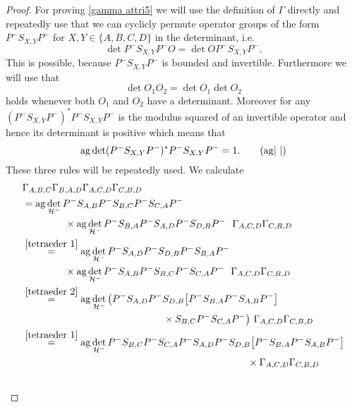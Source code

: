 \documentclass[b5paper,draft,openbib,12pt]{memoir}
\DeclareMathOperator{\ag}{ag}
\begin{document}
\begin{proof}
For proving \eqref{gamma attri5} we will use the definition of \(\Gamma\) directly and repeatedly use that we can cyclicly permute operator groups of the form
\(P^- S_{X,Y}P^-\) for \(X,Y\in \{A,B,C,D\}\) in the determinant, i.e.
\begin{equation}\label{tetraeder 1}
\det P^- S_{X,Y}P^- O = \det O P^- S_{X,Y}P^-.\tag{\(\circlearrowleft\)}
\end{equation}
This is possible, because \(P^- S_{X,Y}P^-\) is bounded and invertible. Furthermore we will use that 
\begin{equation}\label{tetraeder 2}
\det O_1 O_2 = \det O_1 \det O_2\tag{\(\leftrightarrow\)}
\end{equation}
holds whenever 
both \(O_1\) and \(O_2\) have a determinant. Moreover for any  \((P^- S_{X,Y}P^-)^*P^- S_{X,Y}P^-\) is the modulus squared of an invertible operator and hence
its determinant is positive which means that 
\begin{equation}\label{tetraeder 3}
\ag \det (P^- S_{X,Y}P^-)^*P^- S_{X,Y}P^-=1.\tag{\(\ag\!|\,\, |\)}
\end{equation}
These three rules will be repeatedly used. We calculate
\begin{align}
&\Gamma_{A,B,C}\Gamma_{B,A,D}\Gamma_{A,C,D}\Gamma_{C,B,D}\\\notag
&=\ag \det_{\mathcal{H}^-}P^- S_{A,B}P^- S_{B,C}P^- S_{C,A}P^- \\
&\hspace{1,5cm}\times\ag \det_{\mathcal{H}^-}P^- S_{B,A}P^- S_{A,D}P^- S_{D,B}P^-~~ \Gamma_{A,C,D}\Gamma_{C,B,D}\\\notag
&\overset{\eqref{tetraeder 1}}{=}
\ag \det_{\mathcal{H}^-}P^-S_{A,D}P^- S_{D,B}P^- S_{B,A}P^- \\
&\hspace{1.5cm}\times \ag \det_{\mathcal{H}^-}P^- S_{A,B}P^- S_{B,C}P^- S_{C,A}P^- ~~  \Gamma_{A,C,D}\Gamma_{C,B,D}\\\notag
&\overset{\eqref{tetraeder 2}}{=}
\ag \det_{\mathcal{H}^-}\big(P^-S_{A,D}P^- S_{D,B} \big[P^- S_{B,A} P^- S_{A,B}P^-\big]\\
&\hspace{5cm}\times S_{B,C}P^- S_{C,A}P^-\big) ~ \Gamma_{A,C,D}\Gamma_{C,B,D}\\\notag
&\overset{\eqref{tetraeder 1}}{=}
\ag \det_{\mathcal{H}^-}P^-S_{B,C}P^- S_{C,A}P^-S_{A,D}P^- S_{D,B} \big[P^- S_{B,A} P^- S_{A,B}P^-\big]  \\
&\hspace{8cm}\times \Gamma_{A,C,D}\Gamma_{C,B,D}\\\notag

\end{align}
\end{proof}
\end{document}
